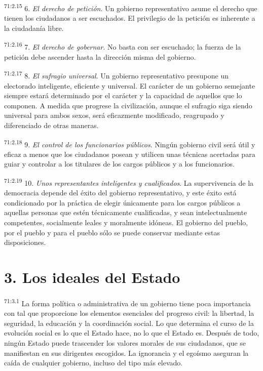 \par
\textsuperscript{71:2.15} 6. \textit{El derecho de petición}. Un gobierno representativo asume el derecho que tienen los ciudadanos a ser escuchados. El privilegio de la petición es inherente a la ciudadanía libre.

\par
\textsuperscript{71:2.16} 7. \textit{El derecho de gobernar}. No basta con ser escuchado; la fuerza de la petición debe ascender hasta la dirección misma del gobierno.

\par
\textsuperscript{71:2.17} 8. \textit{El sufragio universal}. Un gobierno representativo presupone un electorado inteligente, eficiente y universal. El carácter de un gobierno semejante siempre estará determinado por el carácter y la capacidad de aquellos que lo componen. A medida que progrese la civilización, aunque el sufragio siga siendo universal para ambos sexos, será eficazmente modificado, reagrupado y diferenciado de otras maneras.

\par
\textsuperscript{71:2.18} 9. \textit{El control de los funcionarios públicos}. Ningún gobierno civil será útil y eficaz a menos que los ciudadanos posean y utilicen unas técnicas acertadas para guiar y controlar a los titulares de los cargos públicos y a los funcionarios.

\par
\textsuperscript{71:2.19} 10. \textit{Unos representantes inteligentes y cualificados}. La supervivencia de la democracia depende del éxito del gobierno representativo, y este éxito está condicionado por la práctica de elegir únicamente para los cargos públicos a aquellas personas que estén técnicamente cualificadas, y sean intelectualmente competentes, socialmente leales y moralmente idóneas. El gobierno del pueblo, por el pueblo y para el pueblo sólo se puede conservar mediante estas disposiciones.

\section*{3. Los ideales del Estado}
\par
\textsuperscript{71:3.1} La forma política o administrativa de un gobierno tiene poca importancia con tal que proporcione los elementos esenciales del progreso civil: la libertad, la seguridad, la educación y la coordinación social. Lo que determina el curso de la evolución social es lo que el Estado hace, no lo que el Estado es. Después de todo, ningún Estado puede trascender los valores morales de sus ciudadanos, que se manifiestan en sus dirigentes escogidos. La ignorancia y el egoísmo aseguran la caída de cualquier gobierno, incluso del tipo más elevado.

